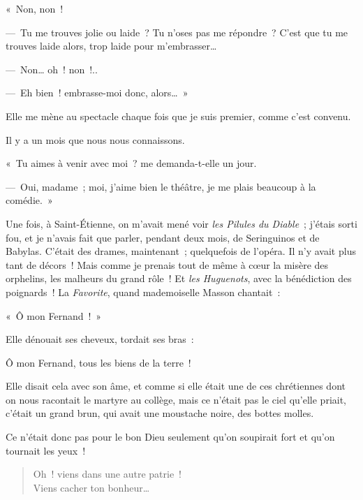 \documentclass[french,twoside]{book} %
\newenvironment{quoteblock}%
  {\begin{quoting}}
  {\end{quoting}}
\newenvironment{quotebar}{%
    \def\FrameCommand{{\color{rubric!10!}\vrule width 0.5em} \hspace{0.9em}}%
    \def\OuterFrameSep{\itemsep} %
    \MakeFramed {\advance\hsize-\width \FrameRestore}
  }%
  {%
    \endMakeFramed
  }
\renewenvironment{quoteblock}%
  {%
    \savenotes
    \setstretch{0.9}
    \normalfont
    \begin{quotebar}
  }
  {%
    \end{quotebar}
    \spewnotes
  }
\begin{document}
« Non, non !\par
— Tu me trouves jolie ou laide ? Tu n’oses pas me répondre ? C’est que tu me trouves laide alors, trop laide pour m’embrasser…\par
— Non… oh ! non !..\par
— Eh bien ! embrasse-moi donc, alors… »\par
\bigbreak
\noindent Elle me mène au spectacle chaque fois que je suis premier, comme c’est convenu.\par
Il y a un mois que nous nous connaissons.\par
« Tu aimes à venir avec moi ? me demanda-t-elle un jour.\par
— Oui, madame ; moi, j’aime bien le théâtre, je me plais beaucoup à la comédie. »\par
Une fois, à Saint-Étienne, on m’avait mené voir \emph{les Pilules du Diable} ; j’étais sorti fou, et je n’avais fait que parler, pendant deux mois, de Seringuinos et de Babylas. C’était des drames, maintenant ; quelquefois de l’opéra. Il n’y avait plus tant de décors ! Mais comme je prenais tout de même à cœur la misère des orphelins, les malheurs du grand rôle ! Et \emph{les Huguenots}, avec la bénédiction des poignards ! La \emph{Favorite}, quand mademoiselle Masson chantait :\par
« Ô mon Fernand ! »\par
Elle dénouait ses cheveux, tordait ses bras :\par

\begin{quoteblock}
\noindent Ô mon Fernand, tous les biens de la terre !\end{quoteblock}

\noindent Elle disait cela avec son âme, et comme si elle était une de ces chrétiennes dont on nous racontait le martyre au collège, mais ce n’était pas le ciel qu’elle priait, c’était un grand brun, qui avait une moustache noire, des bottes molles.\par
Ce n’était donc pas pour le bon Dieu seulement qu’on soupirait fort et qu’on tournait les yeux !\par


\begin{verse}
Oh ! viens dans une autre patrie !\\
Viens cacher ton bonheur…\\
\end{verse}
\end{document}
